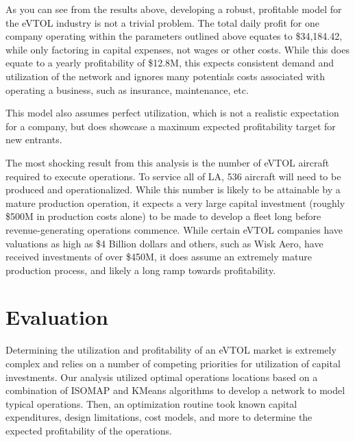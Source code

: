\documentclass{article}
\begin{document}
As you can see from the results above, developing a robust, profitable model for the eVTOL industry is not a trivial problem. The total daily profit for one company operating within the parameters outlined above equates to \$34,184.42, while only factoring in capital expenses, not wages or other costs. While this does equate to a yearly profitability of \$12.8M, this expects consistent demand and utilization of the network and ignores many potentials costs associated with operating a business, such as insurance, maintenance, etc.

This model also assumes perfect utilization, which is not a realistic expectation for a company, but does showcase a maximum expected profitability target for new entrants.

The most shocking result from this analysis is the number of eVTOL aircraft required to execute operations. To service all of LA, 536 aircraft will need to be produced and operationalized. While this number is likely to be attainable by a mature production operation, it expects a very large capital investment (roughly \$500M in production costs alone) to be made to develop a fleet long before revenue-generating operations commence. While certain eVTOL companies have valuations as high as \$4 Billion dollars and others, such as Wisk Aero, have received investments of over \$450M, it does assume an extremely mature production process, and likely a long ramp towards profitability.

\section{Evaluation}

Determining the utilization and profitability of an eVTOL market is extremely complex and relies on a number of competing priorities for utilization of capital investments. Our analysis utilized optimal operations locations based on a combination of ISOMAP and KMeans algorithms to develop a network to model typical operations. Then, an optimization routine took known capital expenditures, design limitations, cost models, and more to determine the expected profitability of the operations.
\end{document}
